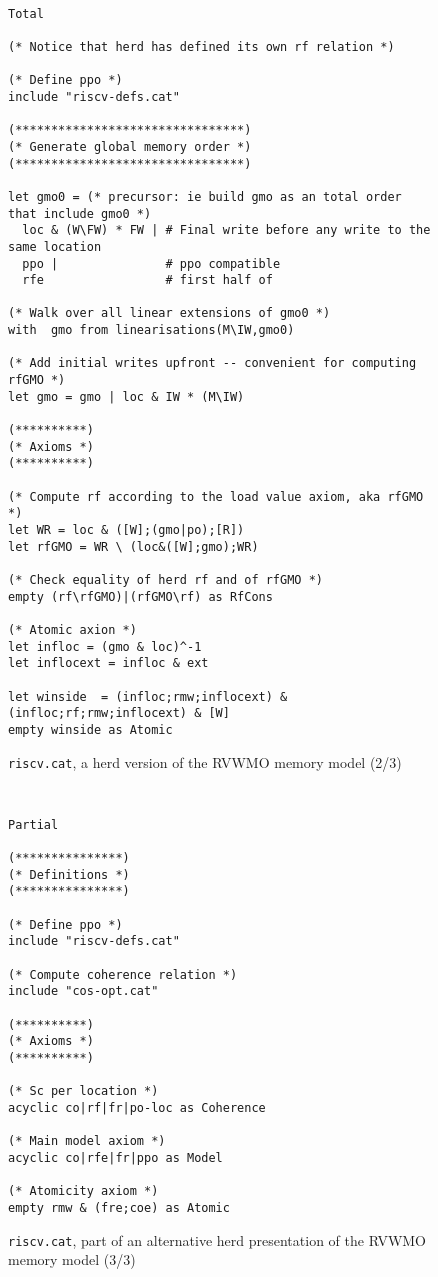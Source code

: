 \begin{figure}[h!]
  {
  \tt\bfseries\centering\footnotesize
  \begin{lstlisting}
Total

(* Notice that herd has defined its own rf relation *)

(* Define ppo *)
include "riscv-defs.cat"

(********************************)
(* Generate global memory order *)
(********************************)

let gmo0 = (* precursor: ie build gmo as an total order that include gmo0 *)
  loc & (W\FW) * FW | # Final write before any write to the same location
  ppo |               # ppo compatible
  rfe                 # first half of 

(* Walk over all linear extensions of gmo0 *)
with  gmo from linearisations(M\IW,gmo0)

(* Add initial writes upfront -- convenient for computing rfGMO *)
let gmo = gmo | loc & IW * (M\IW)

(**********)
(* Axioms *)
(**********)

(* Compute rf according to the load value axiom, aka rfGMO *)
let WR = loc & ([W];(gmo|po);[R])
let rfGMO = WR \ (loc&([W];gmo);WR)

(* Check equality of herd rf and of rfGMO *)
empty (rf\rfGMO)|(rfGMO\rf) as RfCons

(* Atomic axion *)
let infloc = (gmo & loc)^-1
let inflocext = infloc & ext

let winside  = (infloc;rmw;inflocext) & (infloc;rf;rmw;inflocext) & [W]
empty winside as Atomic
\end{lstlisting}
  }
  \caption{{\tt riscv.cat}, a herd version of the RVWMO memory model (2/3)}
  \label{fig:herd2}
\end{figure}

\begin{figure}[h!]
  {
  \tt\bfseries\centering\footnotesize
  \begin{lstlisting}
Partial

(***************)
(* Definitions *)
(***************)

(* Define ppo *)
include "riscv-defs.cat"

(* Compute coherence relation *)
include "cos-opt.cat"

(**********)
(* Axioms *)
(**********)

(* Sc per location *)
acyclic co|rf|fr|po-loc as Coherence

(* Main model axiom *)
acyclic co|rfe|fr|ppo as Model

(* Atomicity axiom *)
empty rmw & (fre;coe) as Atomic
\end{lstlisting}
  }
  \caption{{\tt riscv.cat}, part of an alternative herd presentation of the RVWMO memory model (3/3)}
  \label{fig:herd3}
\end{figure}
